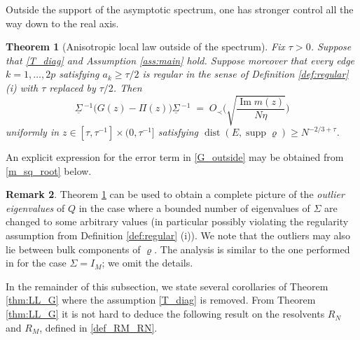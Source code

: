 \documentclass[11pt]{article} %
\numberwithin{equation}{section}
\numberwithin{figure}{section}
\theoremstyle{plain} %
\newtheorem{theorem}{Theorem}[section]
\theoremstyle{definition} %
\newtheorem{remark}[theorem]{Remark}
\newcommand{\ul}[1]{\underline{#1} \!\,} %
\renewcommand{\geq}{\geqslant}
\newcommand{\pb}[1]{\bigl({#1}\bigr)}
\newcommand{\pBB}[1]{\Biggl({#1}\Biggr)}
\DeclareMathOperator{\supp}{supp}
\DeclareMathOperator{\im}{Im}
\DeclareMathOperator{\dist}{dist}
\begin{document}
Outside the support of the asymptotic spectrum, one has stronger control all the way down to the real axis.

\begin{theorem}[Anisotropic local law outside of the spectrum] \label{thm:G_outside}
Fix $\tau > 0$. Suppose that \eqref{T_diag} and Assumption \ref{ass:main} hold. Suppose moreover that every edge $k = 1, \dots, 2p$ satisfying $a_k \geq \tau/2$ is regular in the sense of Definition \ref{def:regular} (i) with $\tau$ replaced by $\tau/2$. Then
\begin{equation} \label{G_outside}
\ul \Sigma^{-1} \pb{G(z) - \Pi(z)} \ul \Sigma^{-1} \;=\; O_\prec \pBB{\sqrt{\frac{\im m(z)}{N \eta}}}
\end{equation}
uniformly in $z \in [\tau, \tau^{-1}] \times (0, \tau^{-1}]$ satisfying $\dist(E, \supp \varrho) \geq N^{-2/3 + \tau}$.
\end{theorem}

An explicit expression for the error term in \eqref{G_outside} may be obtained from \eqref{m_sq_root} below.

\begin{remark}
Theorem \ref{thm:G_outside} can be used to obtain a complete picture of the \emph{outlier eigenvalues} of $Q$ in the case where a bounded number of eigenvalues of $\Sigma$ are changed to some arbitrary values (in particular possibly violating the regularity assumption from Definition \ref{def:regular} (i)). We note that the outliers may also lie between bulk components of $\varrho$. The analysis is similar to the one performed in \cite{KYY} for the case $\Sigma = I_M$; we omit the details.
\end{remark}


In the remainder of this subsection, we state several corollaries of Theorem \ref{thm:LL_G} where the assumption \eqref{T_diag} is removed. From Theorem \ref{thm:LL_G} it is not hard to deduce the following result on the resolvents $R_N$ and $R_M$, defined in \eqref{def_RM_RN}.
\end{document}

